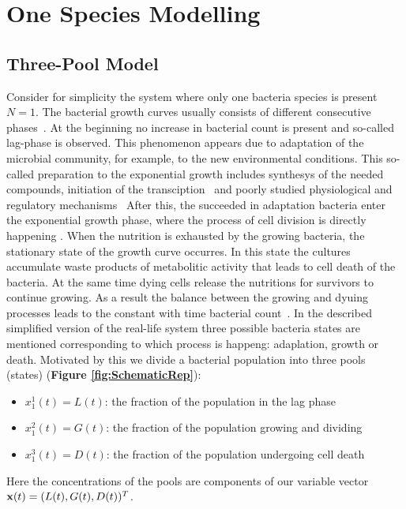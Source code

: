 \documentclass[10pt,A4paper]{article}
\begin{document}
\newpage

\section{One Species Modelling}
\subsection{Three-Pool Model}

Consider for simplicity the system where only one bacteria species is present $N=1$.
The bacterial growth curves usually consists of different consecutive phases~\cite{buchanan_when_1997}.
At the beginning no increase in bacterial count is present and so-called lag-phase is observed.
This phenomenon appears due to adaptation of the microbial community, for example, to the new environmental conditions.
This so-called preparation to the exponential growth includes synthesys of the needed compounds, initiation of the transciption~\cite{rolfe_lag_2012} and poorly studied physiological and regulatory mechanisms~\cite{monod_growth_1949,}
After this, the succeeded in adaptation bacteria enter the exponential growth phase, where the process of cell division is directly happening .
When the nutrition is exhausted by the growing bacteria, the stationary state of the growth curve occurres.
In this state the cultures accumulate waste products of metabolitic activity that leads to cell death of the bacteria.
At the same time dying cells release the nutritions for survivors to continue growing.
As a result the balance between the growing and dyuing processes leads to the constant with time bacterial count~\cite{navarro_llorens_stationary_2010}.
In the described simplified version of the real-life system three possible bacteria states are mentioned corresponding to which process is happeng: adaplation, growth or death.
Motivated by this we divide a bacterial population into three pools (states) (\textbf{Figure \ref{fig:SchematicRep}}): 
\begin{itemize}
\item $x^1_1 (t) = L(t)$: the fraction of the population in the lag phase
\item $x^2_1 (t) = G(t)$: the fraction of the population growing and dividing
\item $x^3_1 (t) = D(t)$: the fraction of the population undergoing cell death
\end{itemize}
Here the concentrations of the pools are components of our variable vector $\mathbf{x} (t) = (L(t), G(t), D(t))^T$.
\end{document}

